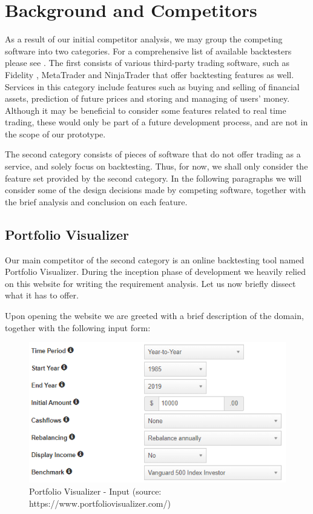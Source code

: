\documentclass[main.tex]{subfiles}
\begin{document}
\section{Background and Competitors}
As a result of our initial competitor analysis, we may group the competing software into two categories. For a comprehensive list of available backtesters please see \cite{listofbacktesters}. The first consists of various third-party trading software, such as Fidelity \cite{Fidelity}, MetaTrader \cite{MetaTrader} and NinjaTrader \cite{NinjaTrader} that offer backtesting features as well. Services in this category include features such as buying and selling of financial assets, prediction of future prices and storing and managing of users' money. Although it may be beneficial to consider some features related to real time trading, these would only be part of a future development process, and are not in the scope of our prototype.

The second category consists of pieces of software that do not offer trading as a service, and solely focus on backtesting. Thus, for now, we shall only consider the feature set provided by the second category. In the following paragraphs we will consider some of the design decisions made by competing software, together with the brief analysis and conclusion on each feature.

\subsection{Portfolio Visualizer}
Our main competitor of the second category is an online backtesting tool named Portfolio Visualizer\cite{portfoliovis}. During the inception phase of development we heavily relied on this website for writing the requirement analysis. Let us now briefly dissect what it has to offer. 

Upon opening the website we are greeted with a brief description of the domain, together with the following input form:

\begin{figure}[H]
   \centering
   \includegraphics[scale=0.8]{02Background/02Pictures/portfolio_visualizer_input_1.png}
   \caption{Portfolio Visualizer - Input (source: https://www.portfoliovisualizer.com/)}
\end{figure}
\end{document}
